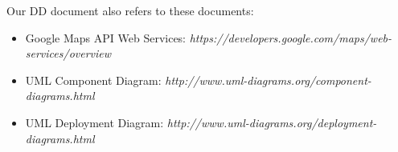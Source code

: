 Our DD document also refers to these documents:
    \begin{itemize}
       \item Google Maps API Web Services: \emph{https://developers.google.com/maps/web-services/overview}
       \item UML Component Diagram: 
       \emph{http://www.uml-diagrams.org/component-diagrams.html}
       \item UML Deployment Diagram: 
       \emph{http://www.uml-diagrams.org/deployment-diagrams.html}
    \end{itemize}
